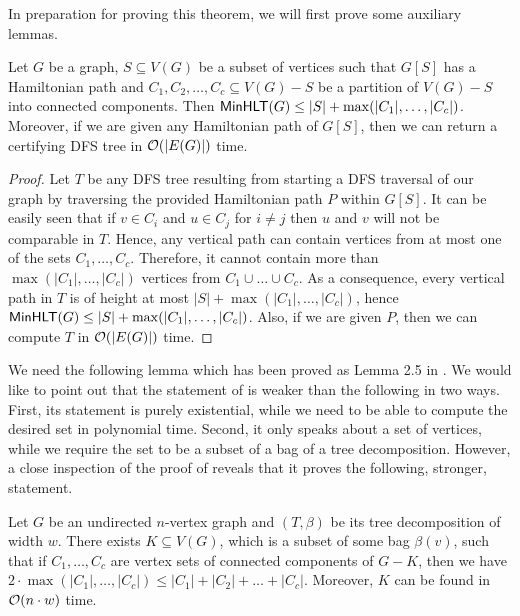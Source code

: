 \documentclass[a4paper,11pt]{article}
\begin{document}
In preparation for proving this theorem, we will first prove some auxiliary lemmas.

\begin{lemma}\label{lem:ham-sep}
Let $G$ be a graph, $S \subseteq V(G)$ be a subset of vertices such that $G[S]$ has a Hamiltonian path and $C_1, C_2, \ldots, C_c \subseteq V(G)-S$ be a partition of $V(G)-S$ into connected components. 
Then $\mathsf{MinHLT}(G) \le |S| + \max(|C_1|, \ldots, |C_c|)$. Moreover, if we are given any Hamiltonian path of $G[S]$, then we can return a certifying DFS tree in ${\mathcal{O}}(|E(G)|)$ time. 
\end{lemma}
\begin{proof}
Let $T$ be any DFS tree resulting from starting a DFS traversal of our graph by traversing the provided Hamiltonian path $P$ within $G[S]$. It can be easily seen that if $v \in C_i$ and $u \in C_j$ for $i \neq j$ then $u$ and $v$ will not be comparable in $T$. 
%
Hence, any vertical path can contain vertices from at most one of the sets $C_1, \ldots, C_c$. Therefore, it cannot contain more than $\max(|C_1|, \ldots, |C_c|)$ vertices from $C_1 \cup \ldots \cup C_c$.
%
As a consequence, every vertical path in $T$ is of height at most $|S| + \max(|C_1|, \ldots, |C_c|)$, hence $\mathsf{MinHLT}(G) \le |S| + \max(|C_1|, \ldots, |C_c|)$. Also, if we are given $P$, then we can compute $T$ in ${\mathcal{O}}(|E(G)|)$ time.
\end{proof}

We need the following lemma which has been proved as Lemma 2.5 in \cite{GraphMinorsII}.
We would like to point out that the statement of \cite[Lemma 2.5]{GraphMinorsII} is weaker than the following in two ways.
First, its statement is purely existential, while we need to be able to compute the desired set in polynomial time.
Second, it only speaks about a set of vertices, 
while we require the set to be a subset of a bag of a tree decomposition.
However, a close inspection of the proof of \cite[Lemma 2.5]{GraphMinorsII}
reveals that it proves the following, stronger, statement.
%
\begin{lemma}\label{lem:balanced-sep-tw}
    Let $G$ be an undirected $n$-vertex graph and $(T, \beta)$ be its tree decomposition of width $w$. 
    There exists $K \subseteq V(G)$, which is a subset of some bag $\beta(v)$, such that if $C_1, \ldots, C_c$ are vertex sets of connected components of $G-K$, then we have $2 \cdot \max(|C_1|, \ldots, |C_c|) \le |C_1| + |C_2| + \ldots + |C_c|$. Moreover, $K$ can be found in ${\mathcal{O}}(n\cdot w)$ time.
\end{lemma}
\end{document}
